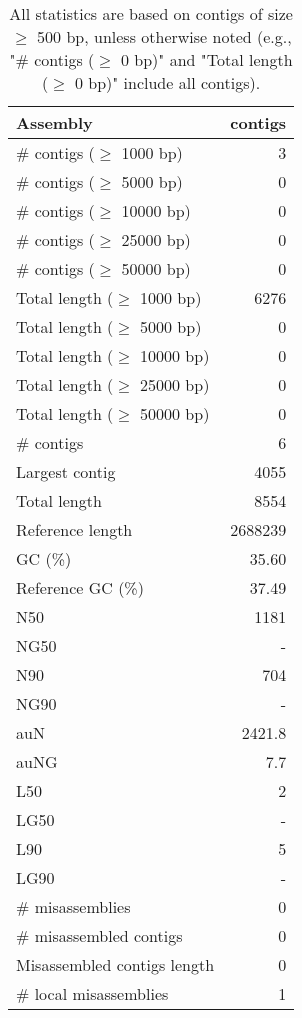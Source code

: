 \documentclass[12pt,a4paper]{article}
\begin{document}
\begin{table}[ht]
\begin{center}
\caption{All statistics are based on contigs of size $\geq$ 500 bp, unless otherwise noted (e.g., "\# contigs ($\geq$ 0 bp)" and "Total length ($\geq$ 0 bp)" include all contigs).}
\begin{tabular}{|l*{1}{|r}|}
\hline
Assembly & contigs \\ \hline
\# contigs ($\geq$ 1000 bp) & 3 \\ \hline
\# contigs ($\geq$ 5000 bp) & 0 \\ \hline
\# contigs ($\geq$ 10000 bp) & 0 \\ \hline
\# contigs ($\geq$ 25000 bp) & 0 \\ \hline
\# contigs ($\geq$ 50000 bp) & 0 \\ \hline
Total length ($\geq$ 1000 bp) & 6276 \\ \hline
Total length ($\geq$ 5000 bp) & 0 \\ \hline
Total length ($\geq$ 10000 bp) & 0 \\ \hline
Total length ($\geq$ 25000 bp) & 0 \\ \hline
Total length ($\geq$ 50000 bp) & 0 \\ \hline
\# contigs & 6 \\ \hline
Largest contig & 4055 \\ \hline
Total length & 8554 \\ \hline
Reference length & 2688239 \\ \hline
GC (\%) & 35.60 \\ \hline
Reference GC (\%) & 37.49 \\ \hline
N50 & 1181 \\ \hline
NG50 & - \\ \hline
N90 & 704 \\ \hline
NG90 & - \\ \hline
auN & 2421.8 \\ \hline
auNG & 7.7 \\ \hline
L50 & 2 \\ \hline
LG50 & - \\ \hline
L90 & 5 \\ \hline
LG90 & - \\ \hline
\# misassemblies & 0 \\ \hline
\# misassembled contigs & 0 \\ \hline
Misassembled contigs length & 0 \\ \hline
\# local misassemblies & 1 \\ \hline

\end{tabular}
\end{center}
\end{table}
\end{document}
